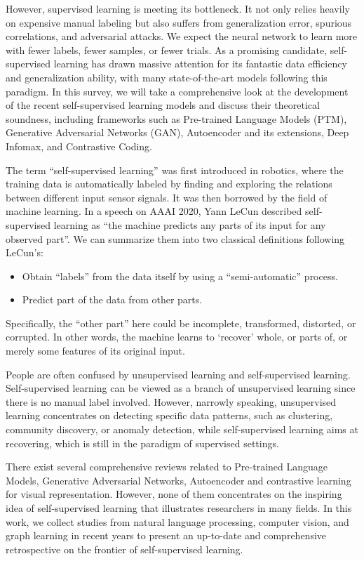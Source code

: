 \documentclass[conference]{IEEEtran}
\begin{document}
However, supervised learning is meeting its bottleneck. 
It not only relies heavily on expensive manual labeling but 
also suffers from generalization error, spurious correlations, 
and adversarial attacks. 
We expect the neural network to learn more with fewer labels, 
fewer samples, or fewer trials.
As a promising  candidate, self-supervised learning has drawn 
massive attention for its fantastic data efficiency and 
generalization ability, with many state-of-the-art models 
following this paradigm. 
In this survey, we will take a comprehensive look at the development
of the recent self-supervised learning models and discuss 
their theoretical soundness, including frameworks such as Pre-trained
Language Models (PTM), Generative Adversarial Networks (GAN),
Autoencoder and its extensions, Deep Infomax, and Contrastive Coding.

The term ``self-supervised learning'' was first introduced in robotics,
where the training data is automatically labeled by finding and 
exploring the relations between different input sensor signals.
It was then borrowed by the field of machine learning.
In a speech on AAAI 2020, Yann LeCun described self-supervised 
learning as ``the machine predicts any parts of its input for 
any observed part''.
We can summarize them into two classical definitions following 
LeCun's:
\begin{itemize}
    \item Obtain ``labels'' from the data itself by using a ``semi-automatic'' process.
    \item Predict part of the data from other parts.
\end{itemize}
Specifically, the ``other part'' here could be incomplete, 
transformed, distorted, or corrupted. In other words, the machine 
learns to `recover' whole, or parts of, or merely some features 
of its original input.

People are often confused by unsupervised learning and self-supervised learning.
Self-supervised learning can be viewed as a branch of unsupervised learning
since there is no manual label involved.
However, narrowly speaking, unsupervised learning concentrates on 
detecting specific data patterns, such as clustering, community discovery,
or anomaly detection, while self-supervised learning aims at recovering,
which is still in the paradigm of supervised settings.

There exist several comprehensive reviews related to Pre-trained Language Models,
Generative Adversarial Networks, Autoencoder and contrastive learning for 
visual representation. 
However, none of them concentrates on the inspiring idea of self-supervised learning 
that illustrates researchers in many fields. 
In this work, we collect studies from natural language processing, 
computer vision, and graph learning in recent years to present an 
up-to-date and comprehensive retrospective on the frontier of self-supervised learning.
\end{document}
